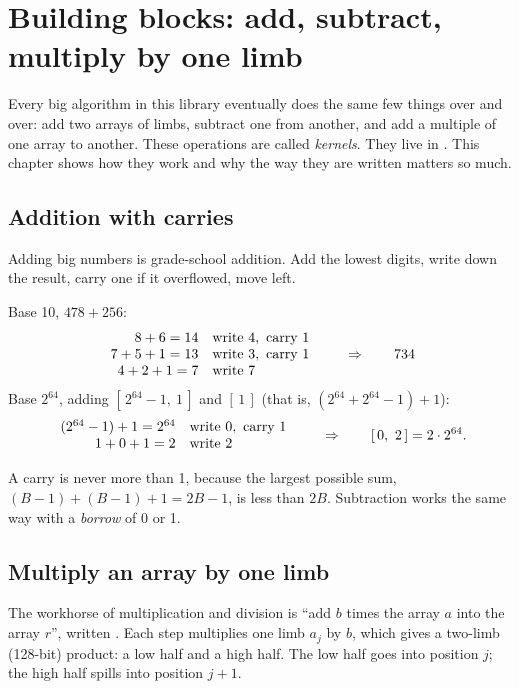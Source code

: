\chapter{Building blocks: add, subtract, multiply by one limb}
\label{ch:basics}

Every big algorithm in this library eventually does the same few things over and over:
add two arrays of limbs, subtract one from another, and add a multiple of one array to
another. These operations are called \emph{kernels}. They live in
. This chapter shows how they work and
why the way they are written matters so much.

\section{Addition with carries}

Adding big numbers is grade-school addition. Add the lowest digits, write down the
result, carry one if it overflowed, move left.

\begin{example}
Base 10, $478 + 256$:
\[
\begin{array}{r@{\quad}l}
8 + 6 = 14 & \text{write } 4, \text{ carry } 1\\
7 + 5 + 1 = 13 & \text{write } 3, \text{ carry } 1\\
4 + 2 + 1 = 7 & \text{write } 7
\end{array}
\qquad\Rightarrow\qquad 734
\]
Base $2^{64}$, adding $[\,2^{64}-1,\ 1\,]$ and $[\,1\,]$ (that is, $(2^{64}+2^{64}-1) + 1$):
\[
\begin{array}{r@{\quad}l}
(2^{64}-1) + 1 = 2^{64} & \text{write } 0, \text{ carry } 1\\
1 + 0 + 1 = 2 & \text{write } 2
\end{array}
\qquad\Rightarrow\qquad [\,0,\ 2\,] = 2 \cdot 2^{64}.
\]
\end{example}

A carry is never more than 1, because the largest possible sum,
$(B-1) + (B-1) + 1 = 2B - 1$, is less than $2B$. Subtraction works the same way with a
\emph{borrow} of 0 or 1.

\section{Multiply an array by one limb}

The workhorse of multiplication and division is ``add $b$ times the array $a$ into the
array $r$'', written . Each step multiplies one limb $a_j$ by
$b$, which gives a two-limb (128-bit) product: a low half and a high half. The low half
goes into position $j$; the high half spills into position $j+1$.

